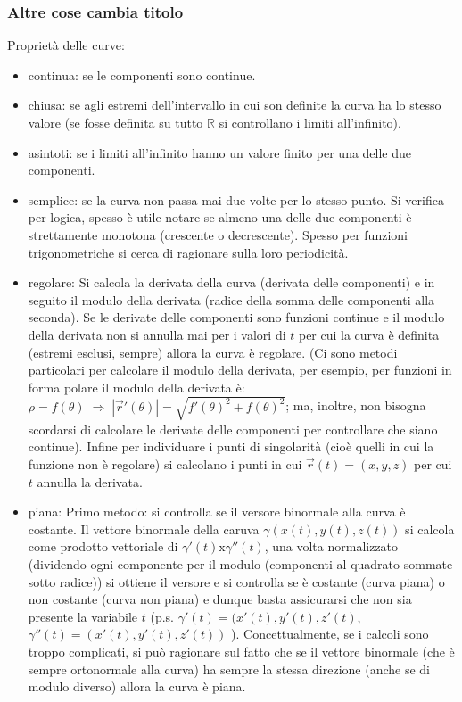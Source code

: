 \subsubsection{Altre cose cambia titolo}
\begin{tcolorbox}
Proprietà delle curve:
\begin{itemize}
    \item continua: se le componenti sono continue.
    \item chiusa: se agli estremi dell'intervallo in cui son definite la curva ha lo stesso valore (se fosse definita su tutto $\mathbb{R}$ si controllano i limiti all'infinito).
    \item asintoti: se i limiti all'infinito hanno un valore finito per una delle due componenti.
    \item semplice: se la curva non passa mai due volte per lo stesso punto. Si verifica per logica, spesso è utile notare se almeno una delle due componenti è strettamente monotona (crescente o decrescente). Spesso per funzioni trigonometriche si cerca di ragionare sulla loro periodicità.
    \item regolare: Si calcola la derivata della curva (derivata delle componenti) e in seguito il modulo della derivata (radice della somma delle componenti alla seconda). Se le derivate delle componenti sono funzioni continue e il modulo della derivata non si annulla mai per i valori di $t$ per cui la curva è definita (estremi esclusi, sempre) allora la curva è regolare. (Ci sono metodi particolari per calcolare il modulo della derivata, per esempio, per funzioni in forma polare il modulo della derivata è: $\rho = f(\theta) \; \Rightarrow \; |\vec{r}'(\theta)| = \sqrt{f'(\theta)^2 + f(\theta)^2}$; ma, inoltre, non bisogna scordarsi di calcolare le derivate delle componenti per controllare che siano continue).\newline
    Infine per individuare i punti di singolarità (cioè quelli in cui la funzione non è regolare) si calcolano i punti in cui $\vec{r}(t) = (x,y,z)$ per cui $t$ annulla la derivata.
    \item piana: \newline
    Primo metodo: si controlla se il versore binormale alla curva è costante. Il vettore binormale della caruva $\gamma(x(t), y(t), z(t))$ si calcola come prodotto vettoriale di $\gamma'(t) \text{x} \gamma''(t)$, una volta normalizzato (dividendo ogni componente per il modulo (componenti al quadrato sommate sotto radice)) si ottiene il versore e si controlla se è costante (curva piana) o non costante (curva non piana) e dunque basta assicurarsi che non sia presente la variabile $t$ (p.s. $\gamma'(t) = (x'(t), y'(t), z'(t)$, $\gamma''(t) = (x'(t), y'(t), z'(t))$ ). Concettualmente, se i calcoli sono troppo complicati, si può ragionare sul fatto che se il vettore binormale (che è sempre ortonormale alla curva) ha sempre la stessa direzione (anche se di modulo diverso) allora la curva è piana.\newline

\end{itemize}
\end{tcolorbox}
